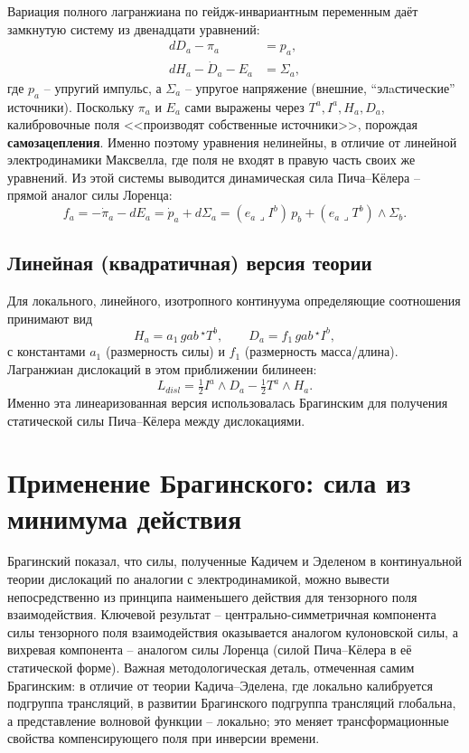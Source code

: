 \documentclass[12pt,a4paper]{article}
\begin{document}
Вариация полного лагранжиана по гейдж-инвариантным переменным даёт
замкнутую систему из двенадцати уравнений:
\begin{align}
dD_a - \pi_a &= p_a, \\
dH_a - \dot D_a - E_a &= \Sigma_a,
\end{align}
где $p_a$ -- упругий импульс, а $\Sigma_a$ -- упругое напряжение
(внешние, ``элaстические'' источники). Поскольку $\pi_a$ и $E_a$ сами
выражены через $T^a, I^a, H_a, D_a$, калибровочные поля <<производят
собственные источники>>, порождая \textbf{самозацепления}. Именно
поэтому уравнения нелинейны, в отличие от линейной электродинамики
Максвелла, где поля не входят в правую часть своих же уравнений.
Из этой системы выводится динамическая сила Пича--Кёлера -- прямой
аналог силы Лоренца:
\begin{equation}
f_a = -\dot\pi_a - dE_a = \dot p_a + d\Sigma_a
= (e_a\lrcorner I^b)\,p_b + (e_a\lrcorner T^b)\wedge \Sigma_b.
\end{equation}

\subsection{Линейная (квадратичная) версия теории}

Для локального, линейного, изотропного континуума определяющие
соотношения принимают вид
\begin{equation}
H_a = a_1\,gab\,{}^\star T^b,\qquad D_a = f_1\,gab\,{}^\star I^b,
\end{equation}
с константами $a_1$ (размерность силы) и $f_1$ (размерность
масса/длина). Лагранжиан дислокаций в этом приближении билинеен:
\begin{equation}
L_{disl}=\tfrac12 I^a\wedge D_a - \tfrac12 T^a\wedge H_a.
\end{equation}
Именно эта линеаризованная версия использовалась Брагинским для
получения статической силы Пича--Кёлера между дислокациями.

\section{Применение Брагинского: сила из минимума действия}

Брагинский показал, что силы, полученные Кадичем и Эделеном в
континуальной теории дислокаций по аналогии с электродинамикой, можно
вывести непосредственно из принципа наименьшего действия для тензорного
поля взаимодействия. Ключевой результат -- центрально-симметричная
компонента силы тензорного поля взаимодействия оказывается аналогом
кулоновской силы, а вихревая компонента -- аналогом силы Лоренца
(силой Пича--Кёлера в её статической форме). Важная методологическая
деталь, отмеченная самим Брагинским: в отличие от теории Кадича--Эделена,
где локально калибруется подгруппа трансляций, в развитии Брагинского
подгруппа трансляций глобальна, а представление волновой функции --
локально; это меняет трансформационные свойства компенсирующего поля
при инверсии времени.
\end{document}
